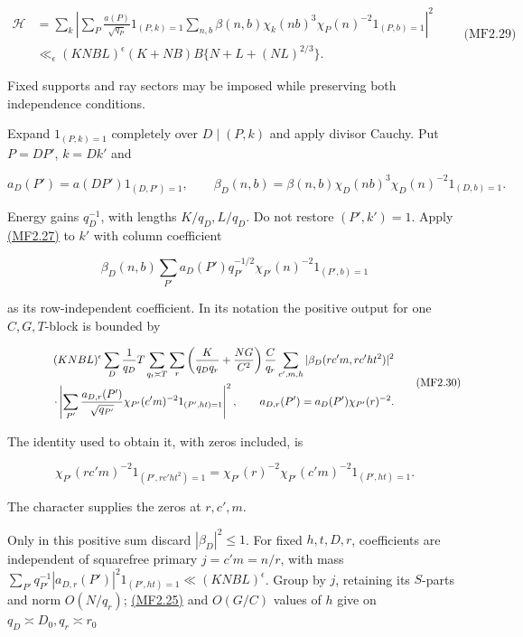 \hypertarget{mf:eq:B2.29}{}

\label{mf:eq:B2.29}

\[
\begin{aligned}
\mathcal H&=
\sum_k\left|
\sum_P\frac{a(P)}{\sqrt{q_P}}1_{(P,k)=1}
\sum_{n,b}\beta(n,b)\chi_k(nb)^3\chi_P(n)^{-2}1_{(P,b)=1}
\right|^2\\
&\ll_\epsilon(KNBL)^\epsilon
(K+NB)B\{N+L+(NL)^{2/3}\}.
\end{aligned}
\qquad\text{(MF2.29)}
\]

Fixed supports and ray sectors may be imposed while preserving both independence conditions.

Expand \(1_{(P,k)=1}\) completely over \(D\mid(P,k)\) and apply divisor Cauchy. Put \(P=DP'\), \(k=Dk'\) and

\[
a_D(P')=a(DP')1_{(D,P')=1},\qquad
\beta_D(n,b)=\beta(n,b)\chi_D(nb)^3\chi_D(n)^{-2}1_{(D,b)=1}.
\]

Energy gains \(q_D^{-1}\), with lengths \(K/q_D,L/q_D\). Do not restore \((P',k')=1\). Apply \protect\hyperlink{mf:eq:B2.27}{(MF2.27)} to \(k'\) with column coefficient

\[
\beta_D(n,b)\sum_{P'}a_D(P')q_{P'}^{-1/2}
\chi_{P'}(n)^{-2}1_{(P',b)=1}
\]

as its row-independent coefficient. In its notation the positive output for one \(C,G,T\)-block is bounded by

\hypertarget{mf:eq:B2.30}{}

\label{mf:eq:B2.30}

\[
\begin{aligned}
(KNBL)^\epsilon
\sum_D\frac1{q_D}T\sum_{q_t\asymp T}\sum_r
\left(\frac K{q_Dq_r}+\frac{NG}{C^2}\right)\frac C{q_r}
\sum_{c',m,h}|\beta_D(rc'm,rc'ht^2)|^2\\
\hspace{15mm}\cdot
\left|\sum_{P'}\frac{a_{D,r}(P')}{\sqrt{q_{P'}}}
\chi_{P'}(c'm)^{-2}1_{(P',ht)=1}\right|^2,
\qquad a_{D,r}(P')=a_D(P')\chi_{P'}(r)^{-2}.
\end{aligned}
\qquad\text{(MF2.30)}
\]

The identity used to obtain it, with zeros included, is

\[
\chi_{P'}(rc'm)^{-2}1_{(P',rc'ht^2)=1}
=\chi_{P'}(r)^{-2}\chi_{P'}(c'm)^{-2}1_{(P',ht)=1}.
\]

The character supplies the zeros at \(r,c',m\).

Only in this positive sum discard \(|\beta_D|^2\le1\). For fixed \(h,t,D,r\), coefficients are independent of squarefree primary \(j=c'm=n/r\), with mass \(\sum_{P'}q_{P'}^{-1}|a_{D,r}(P')|^2 1_{(P',ht)=1}\ll(KNBL)^\epsilon\). Group by \(j\), retaining its \(S\)-parts and norm \(O(N/q_r)\); \protect\hyperlink{mf:eq:B2.25}{(MF2.25)} and \(O(G/C)\) values of \(h\) give on \(q_D\asymp D_0,q_r\asymp r_0\)

